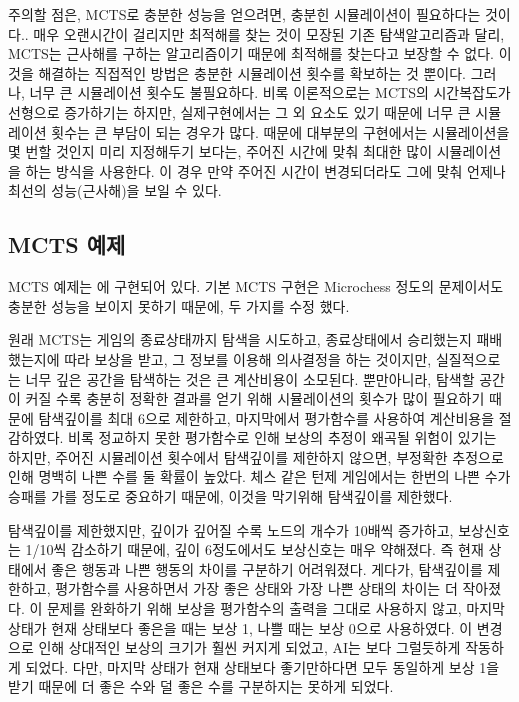 \documentclass[letterpaper,10pt,english]{sphinxmanual}
\begin{document}
주의할 점은, MCTS로 충분한 성능을 얻으려면, 충분힌 시뮬레이션이 필요하다는 것이다..
매우 오랜시간이 걸리지만 최적해를 찾는 것이 모장된 기존 탐색알고리즘과 달리,
MCTS는 근사해를 구하는 알고리즘이기 때문에 최적해를 찾는다고 보장할 수 없다.
이것을 해결하는 직접적인 방법은 충분한 시뮬레이션 횟수를 확보하는 것 뿐이다.
그러나, 너무 큰 시뮬레이션 횟수도 불필요하다.
비록 이론적으로는 MCTS의 시간복잡도가 선형으로 증가하기는 하지만,
실제구현에서는 그 외 요소도 있기 때문에 너무 큰 시뮬레이션 횟수는 큰 부담이 되는 경우가 많다.
때문에 대부분의 구현에서는 시뮬레이션을 몇 번할 것인지 미리 지정해두기 보다는,
주어진 시간에 맞춰 최대한 많이 시뮬레이션을 하는 방식을 사용한다.
이 경우 만약 주어진 시간이 변경되더라도 그에 맞춰 언제나 최선의 성능(근사해)을 보일 수 있다.


\subsection{MCTS 예제}
\label{\detokenize{04-mcts:id3}}
MCTS 예제는 {\hyperref[\detokenize{agents.search:agents.search.mcts_agent.MCTSAgent}]{}} 에 구현되어 있다.
기본 MCTS 구현은 Microchess 정도의 문제이서도 충분한 성능을 보이지 못하기 때문에, 두 가지를 수정 했다.


원래 MCTS는 게임의 종료상태까지 탐색을 시도하고, 종료상태에서 승리했는지 패배했는지에 따라 보상을 받고,
그 정보를 이용해 의사결정을 하는 것이지만, 실질적으로는 너무 깊은 공간을 탐색하는 것은 큰 계산비용이 소모된다.
뿐만아니라, 탐색할 공간이 커질 수록 충분히 정확한 결과를 얻기 위해 시뮬레이션의 횟수가 많이 필요하기 때문에
탐색깊이를 최대 6으로 제한하고, 마지막에서 평가함수를 사용하여 계산비용을 절감하였다.
비록 정교하지 못한 평가함수로 인해 보상의 추정이 왜곡될 위험이 있기는 하지만,
주어진 시뮬레이션 횟수에서 탐색깊이를 제한하지 않으면, 부정확한 추정으로 인해 명백히 나쁜 수를 둘 확률이 높았다.
체스 같은 턴제 게임에서는 한번의 나쁜 수가 승패를 가를 정도로 중요하기 때문에, 이것을 막기위해 탐색깊이를 제한했다.


탐색깊이를 제한했지만, 깊이가 깊어질 수록 노드의 개수가 10배씩 증가하고, 보상신호는 1/10씩 감소하기 때문에,
깊이 6정도에서도 보상신호는 매우 약해졌다. 즉 현재 상태에서 좋은 행동과 나쁜 행동의 차이를 구분하기 어려워졌다.
게다가, 탐색깊이를 제한하고, 평가함수를 사용하면서 가장 좋은 상태와 가장 나쁜 상태의 차이는 더 작아졌다.
이 문제를 완화하기 위해 보상을 평가함수의 출력을 그대로 사용하지 않고,
마지막 상태가 현재 상태보다 좋은을 때는 보상 1, 나쁠 때는 보상 0으로 사용하였다.
이 변경으로 인해 상대적인 보상의 크기가 훨씬 커지게 되었고, AI는 보다 그럴듯하게 작동하게 되었다.
다만, 마지막 상태가 현재 상태보다 좋기만하다면 모두 동일하게 보상 1을 받기 때문에 더 좋은 수와 덜 좋은 수를 구분하지는
못하게 되었다.
\end{document}
